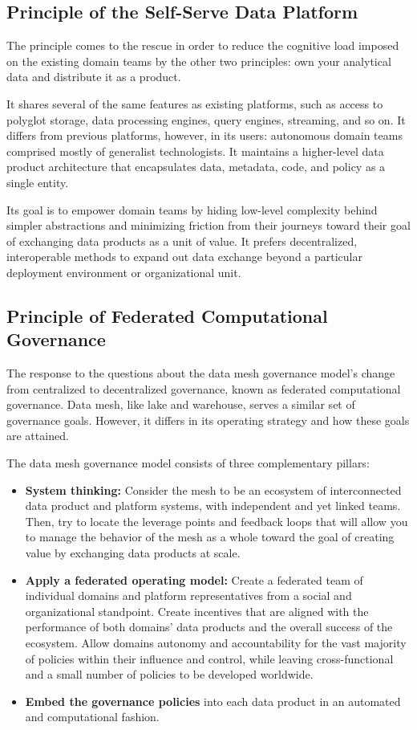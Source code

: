 \documentclass[12pt, a4paper]{book}
\begin{document}
\subsection{Principle of the Self-Serve Data Platform}
The principle comes to the rescue in order to reduce the cognitive load imposed on the existing domain teams by the other two principles: own your analytical data and distribute it as a product.

It shares several of the same features as existing platforms, such as access to polyglot storage, data processing engines, query engines, streaming, and so on. It differs from previous platforms, however, in its users: autonomous domain teams comprised mostly of generalist technologists. It maintains a higher-level data product architecture that encapsulates data, metadata, code, and policy as a single entity.

Its goal is to empower domain teams by hiding low-level complexity behind simpler abstractions and minimizing friction from their journeys toward their goal of exchanging data products as a unit of value. It prefers decentralized, interoperable methods to expand out data exchange beyond a particular deployment environment or organizational unit.


\subsection{Principle of Federated Computational Governance}
The response to the questions about the data mesh governance model's change from centralized to decentralized governance, known as federated computational governance. Data mesh, like lake and warehouse, serves a similar set of governance goals. However, it differs in its operating strategy and how these goals are attained.

The data mesh governance model consists of three complementary pillars:
	\begin{itemize}
		\item \textbf{System thinking:} Consider the mesh to be an ecosystem of interconnected data product and platform systems, with independent and yet linked teams. Then, try to locate the leverage points and feedback loops that will allow you to manage the behavior of the mesh as a whole toward the goal of creating value by exchanging data products at scale.
		\item \textbf{Apply a federated operating model:} Create a federated team of individual domains and platform representatives from a social and organizational standpoint. Create incentives that are aligned with the performance of both domains' data products and the overall success of the ecosystem. Allow domains autonomy and accountability for the vast majority of policies within their influence and control, while leaving cross-functional and a small number of policies to be developed worldwide.
		\item \textbf{Embed the governance policies} into each data product in an automated and computational fashion. 
	\end{itemize}
\end{document}
